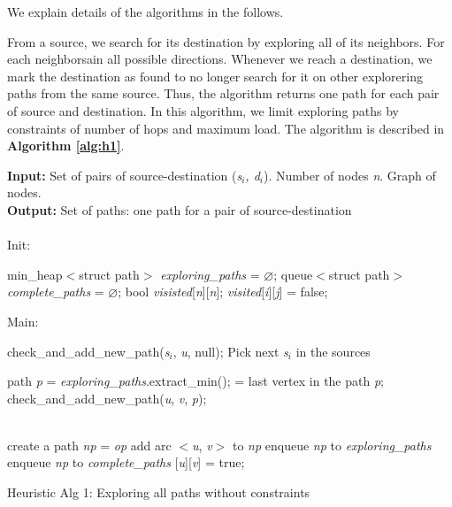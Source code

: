 We explain details of the algorithms in the follows.

From a source, we search for its destination by exploring all of its neighbors. For each neighborsain all possible directions.  Whenever we reach a destination, we mark the destination as found to no longer search for it on other explorering paths from the same source. Thus, the algorithm returns one path for each pair of source and destination. In this algorithm, we limit exploring paths by constraints of number of hops and maximum load. The algorithm is described in \textbf{Algorithm \ref{alg:h1}}.

\begin{algorithm}[!htp]
\textbf{Input:} Set of pairs of source-destination (\textit{s$_i$, d$_i$}). Number of nodes \textit{n}. Graph of nodes. \\
\textbf{Output:} Set of paths: one path for a pair of source-destination \\
\\
Init:
    \begin{algorithmic}
	\State min\_heap$<$struct path$>$ \textit{exploring\_paths} = $\varnothing$;
	\State queue$<$struct path$>$ \textit{complete\_paths} = $\varnothing$;
	\State bool \textit{visisted}[\textit{n}][\textit{n}];
	    \State \textit{visited}[{\it i}][{\it j}] = false;
	\EndFor
    \end{algorithmic}
Main:

\begin{algorithmic}

	\State check\_and\_add\_new\_path({\it s}$_i$, \textit{u}, null);
	\State Pick next \textit{s$_i$} in the sources
    \EndWhile

	\State path \textit{p} = \textit{exploring\_paths}.extract\_min();
	 = last vertex in the path {\it p};
	    \State check\_and\_add\_new\_path({\it u}, \textit{v}, {\it p});
	\EndFor
    \EndWhile

    \EndFunction
\\
	    \State create a path \textit{np} = {\it op}
	    \State add arc $<$\textit{u}, \textit{v}$>$ to \textit{np}
	    \State enqueue \textit{np} to \textit{exploring\_paths}
	        \State enqueue \textit{np} to \textit{complete\_paths}
            \EndIf
	    [\textit{u}][\textit{v}] = true;
	\EndIf
    \EndFunction
\end{algorithmic}

\caption{Heuristic Alg 1: Exploring all paths without constraints}
\label{alg:h1}

\end{algorithm}

